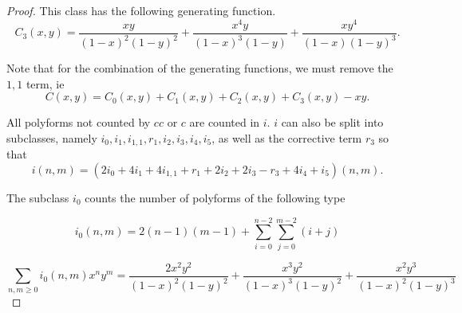 \documentclass[12pt]{article}
\theoremstyle{plain}
\theoremstyle{definition}
\theoremstyle{remark}
\theoremstyle{definition}
\newcommand{\cellw}[4]{\draw[thick] ( #1 , #2 ) rectangle ( #3 , #4 );}
\newcommand{\cellb}[4]{\filldraw[black!60] ( #1 , #2 ) rectangle ( #3 , #4 ); \draw[thick] ( #1 , #2 ) rectangle ( #3 , #4 );}
\begin{document}
\begin{proof}
This class has the following generating function.
$$C_3(x,y)=\frac{xy}{(1-x)^2(1-y)^2}+\frac{x^4 y}{(1-x)^3(1-y)}+\frac{xy^4}{(1-x)(1-y)^3}.$$

Note that for the combination of the generating functions, we must remove the $1,1$ term, ie
$$C(x,y)=C_0(x,y)+C_1(x,y)+C_2(x,y)+C_3(x,y)-xy.$$

All polyforms not counted by $cc$ or $c$ are counted in $i$. $i$ can also be split into subclasses, namely $i_0,i_1,i_{1,1},r_1,i_2,i_3,i_4, i_5$, as well as the corrective term $r_3$ so that 
$$i(n,m)=(2i_{0}+4i_{1}+4i_{1,1}+r_1+2i_{2}+2i_{3}-r_3 + 4i_{4} + i_5)(n,m).$$

The subclass $i_0$ counts the number of polyforms of the following type
\begin{center}
\end{center}

\begin{equation*}
    i_0(n,m)= 2(n-1)(m-1) + \sum_{i=0}^{n-2}\sum_{j=0}^{m-2} (i+j)
\end{equation*}

\begin{equation*}
    \sum_{n,m \geq 0}i_0(n,m)x^n y^m = \frac{2 x^2 y^2}{(1-x)^2 (1-y)^2} + \frac{x^3 y^2}{(1-x)^3(1-y)^2} + \frac{x^2 y^3}{(1-x)^2 (1-y)^3}
\end{equation*}


\end{proof}
\end{document}
